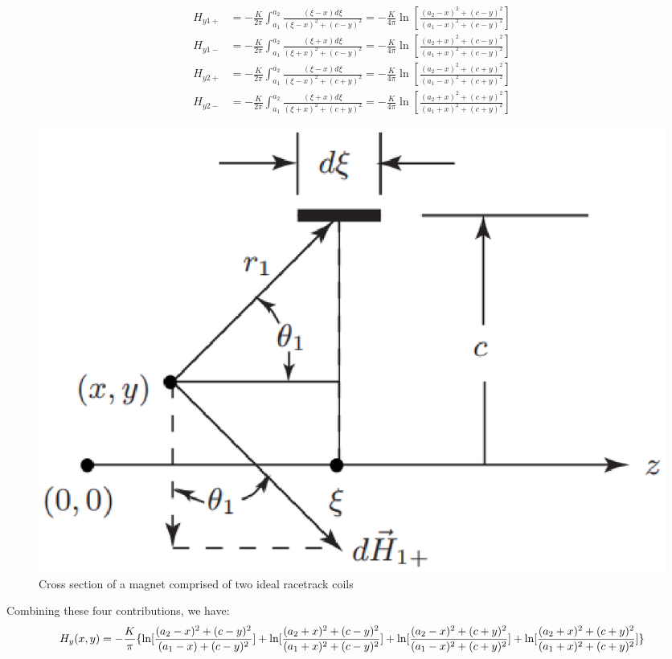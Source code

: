 \begin{eqnarray*}
H_{y1+}&=-\frac{K}{2\pi}\int_{a_{1}}^{a_{2}}\frac{(\xi-x)d\xi}{(\xi-x)^{2}+(c-y)^{2}}=-\frac{K}{4\pi}\ln[\frac{(a_{2}-x)^{2}+(c-y)^{2}}{(a_{1}-x)^{2}+(c-y)^{2}}]\\%
H_{y1-}&=-\frac{K}{2\pi}\int_{a_{1}}^{a_{2}}\frac{(\xi+x)d\xi}{(\xi+x)^{2}+(c-y)^{2}}=-\frac{K}{4\pi}\ln[\frac{(a_{2}+x)^{2}+(c-y)^{2}}{(a_{1}+x)^{2}+(c-y)^{2}}]\\%
H_{y2+}&=-\frac{K}{2\pi}\int_{a_{1}}^{a_{2}}\frac{(\xi-x)d\xi}{(\xi-x)^{2}+(c+y)^{2}}=-\frac{K}{4\pi}\ln[\frac{(a_{2}-x)^{2}+(c+y)^{2}}{(a_{1}-x)^{2}+(c+y)^{2}}]\\%
H_{y2-}&=-\frac{K}{2\pi}\int_{a_{1}}^{a_{2}}\frac{(\xi+x)d\xi}{(\xi+x)^{2}+(c+y)^{2}}=-\frac{K}{4\pi}\ln[\frac{(a_{2}+x)^{2}+(c+y)^{2}}{(a_{1}+x)^{2}+(c+y)^{2}}]%
\end{eqnarray*}

\begin{figure}[htbp]
	\centering
	\includegraphics[scale=0.5]{chpt3/figs/fig3.37.eps}
	\caption{Cross section of a magnet comprised of two ideal racetrack coils}
\end{figure}

Combining these four contributions, we have:
$$H_{y}(x,y)=-\frac{K}{\pi}\{\ln[\frac{(a_{2}-x)^{2}+(c-y)^{2}}{(a_{1}-x)+(c-y)^{2}}]+\ln[\frac{(a_{2}+x)^{2}+(c-y)^{2}}{(a_{1}+x)^{2}+(c-y)^{2}}]\\
+\ln[\frac{(a_{2}-x)^{2}+(c+y)^{2}}{(a_{1}-x)^{2}+(c+y)^{2}}]+\ln[\frac{(a_{2}+x)^{2}+(c+y)^{2}}{(a_{1}+x)^{2}+(c+y)^{2}}]\}\\%
$$


